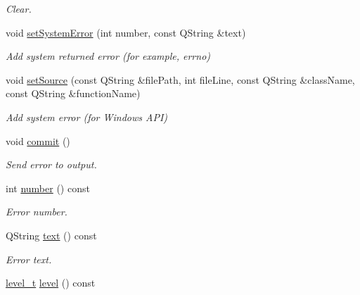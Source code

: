 \begin{DoxyCompactItemize}
\begin{DoxyCompactList}\small\item\em Clear. \end{DoxyCompactList}\item 
\hypertarget{classmdt_error_a49254fdb566fee1a4adafe6a3694befc}{
void \hyperlink{classmdt_error_a49254fdb566fee1a4adafe6a3694befc}{setSystemError} (int number, const QString \&text)}
\label{classmdt_error_a49254fdb566fee1a4adafe6a3694befc}

\begin{DoxyCompactList}\small\item\em Add system returned error (for example, errno) \end{DoxyCompactList}\item 
void \hyperlink{classmdt_error_a8dd3203e11b308e6c2701d7f075af885}{setSource} (const QString \&filePath, int fileLine, const QString \&className, const QString \&functionName)
\begin{DoxyCompactList}\small\item\em Add system error (for Windows API) \end{DoxyCompactList}\item 
\hypertarget{classmdt_error_ad3cccf7c7f7d4bdabdcb4e60794bb9cb}{
void \hyperlink{classmdt_error_ad3cccf7c7f7d4bdabdcb4e60794bb9cb}{commit} ()}
\label{classmdt_error_ad3cccf7c7f7d4bdabdcb4e60794bb9cb}

\begin{DoxyCompactList}\small\item\em Send error to output. \end{DoxyCompactList}\item 
int \hyperlink{classmdt_error_ad233adb8efe4180b85f584c5afdd49fc}{number} () const 
\begin{DoxyCompactList}\small\item\em Error number. \end{DoxyCompactList}\item 
\hypertarget{classmdt_error_a8630bb6b21b70edfe3d13eaff82a1baf}{
QString \hyperlink{classmdt_error_a8630bb6b21b70edfe3d13eaff82a1baf}{text} () const }
\label{classmdt_error_a8630bb6b21b70edfe3d13eaff82a1baf}

\begin{DoxyCompactList}\small\item\em Error text. \end{DoxyCompactList}\item 
\hypertarget{classmdt_error_a8d8382d3008de890689df415deb7766e}{
\hyperlink{classmdt_error_a5c8b1a040e2feaa848f6201d6b6f0cd7}{level\_\-t} \hyperlink{classmdt_error_a8d8382d3008de890689df415deb7766e}{level} () const }
\label{classmdt_error_a8d8382d3008de890689df415deb7766e}


\end{DoxyCompactItemize}
